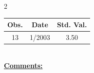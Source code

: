 
\bigskip 
\begin{multicols}{2}{ 
\begin{tabular}{ccc}
\hline  Obs.  &  Date &  Std. Val. \\ 
\hline 
                       13 &        1/2003 &          3.50 \vspace{-.12in} \\  
 \end{tabular} 
\\ 
 \columnbreak 
 \singlespacing 
 \underline{\textbf{Comments:}} \\ 
 \bigskip       

 } 
\end{multicols} 
